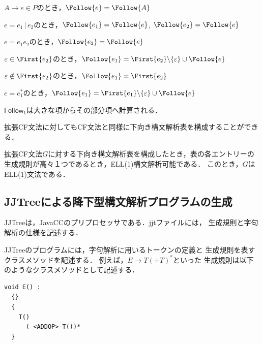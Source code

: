 \documentclass[a4j,dvipdfmx]{jbook}
\begin{document}
\begin{Def}
  $A\rightarrow e\in P$のとき，$\Follow{e}=\Follow{A}$
  \begin{list}{}{}
    \item $e=e_1\,|\,e_2$のとき，$\Follow{e_1}=\Follow{e}$, $\Follow{e_2}=\Follow{e}$
    \item $e=e_1 e_2$のとき，$\Follow{e_2}=\Follow{e}$
    \begin{list}{}{}
      \item $\varepsilon\in\First{e_2}$のとき，$\Follow{e_1}=\First{e_2}\backslash\{\varepsilon\}\cup\Follow{e}$
      \item $\varepsilon\notin\First{e_2}$のとき，$\Follow{e_1}=\First{e_2}$
    \end{list}
    \item $e=e_1^\ast$のとき，$\Follow{e_1}=\First{e_1}\backslash\{\varepsilon\}\cup\Follow{e}$
  \end{list}

  $\mathsf{Follow}_1$は大きな項からその部分項へ計算される．
\end{Def}

拡張CF文法に対してもCF文法と同様に下向き構文解析表を構成することができる．

\begin{Def}
  拡張CF文法$G$に対する下向き構文解析表を構成したとき，表の各エントリーの
  生成規則が高々１つであるとき，ELL(1)構文解析可能である．
  このとき，$G$はELL(1)文法である．
\end{Def}

\subsection{JJTreeによる降下型構文解析プログラムの生成}

JJTreeは，JavaCCのプリプロセッサである．jjtファイルには，
生成規則と字句解析の仕様を記述する．

JJTreeのプログラムには，字句解析に用いるトークンの定義と
生成規則を表すクラスメソッドを記述する．
例えば，$E\rightarrow T(\texttt{+}T)^\ast$といった
生成規則は以下のようなクラスメソッドとして記述する．

\begin{center}
\begin{minipage}{0.5\textwidth}
\begin{Verbatim}[frame=single]
  void E() :
  {}
  {
    T()
      ( <ADDOP> T())*
  }
\end{Verbatim}
\end{minipage}
\end{center}
\end{document}
